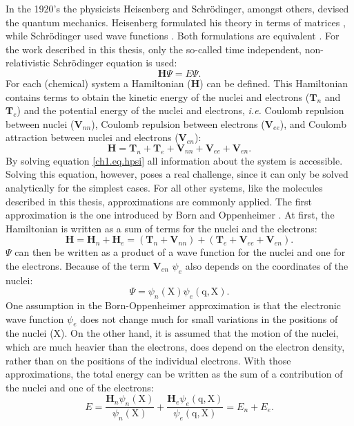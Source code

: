 In the 1920's the physicists Heisenberg and Schr\"{o}dinger, amongst others, devised the quantum mechanics. Heisenberg formulated his theory in terms of matrices \cite{heisenberg}, while Schr\"{o}dinger used wave functions \cite{schrodinger1,schrodinger2}. Both formulations are equivalent \cite{schrodinger3}. For the work described in this thesis, only the so-called time independent, non-relativistic Schr\"{o}dinger equation is used:
\begin{equation}
\mathbf{H} \Psi=E \Psi.
\label{ch1.eq.hpsi}
\end{equation}
For each (chemical) system a Hamiltonian ($\mathbf{H}$) can be defined. This Hamiltonian contains terms to obtain the kinetic energy of the nuclei and electrons ($\mathbf{T}_n$ and $\mathbf{T}_e$) and the potential energy of the nuclei and electrons, \textit{i.e.} Coulomb repulsion between nuclei ($\mathbf{V}_{nn}$), Coulomb repulsion between electrons ($\mathbf{V}_{ee}$), and Coulomb attraction between nuclei and electrons ($\mathbf{V}_{en}$):
\begin{equation}
\mathbf{H} = \mathbf{T}_n + \mathbf{T}_e + \mathbf{V}_{nn} + \mathbf{V}_{ee} + \mathbf{V}_{en}.
\label{ch1.eq.htotal}
\end{equation}
By solving equation \ref{ch1.eq.hpsi} all information about the system is accessible. Solving this equation, however, poses a real challenge, since it can only be solved analytically for the simplest cases. For all other systems, like the molecules described in this thesis, approximations are commonly applied. The first approximation is the one introduced by Born and Oppenheimer \cite{born}. At first, the Hamiltonian is written as a sum of terms for the nuclei and the electrons:
\begin{equation}
\mathbf{H} = \mathbf{H}_n + \mathbf{H}_e = (\mathbf{T}_n + \mathbf{V}_{nn}) + (\mathbf{T}_e + \mathbf{V}_{ee} + \mathbf{V}_{en}).
\label{ch1.eq.hsplit}
\end{equation}
$\Psi$ can then be written as a product of a wave function for the nuclei and one for the electrons. Because of the term $\mathbf{V}_{en}$ $\psi_{e}$ also depends on the coordinates of the nuclei:
\begin{equation}
\Psi = \psi_{n}(\mathrm{X}) \psi_{e}(\mathrm{q,X}).
\end{equation}
One assumption in the Born-Oppenheimer approximation is that the electronic wave function $\psi_{e}$ does not change much for small variations in the positions of the nuclei ($\mathrm{X}$). On the other hand, it is assumed that the motion of the nuclei, which are much heavier than the electrons, does depend on the electron density, rather than on the positions of the individual electrons. With those approximations, the total energy can be written as the sum of a contribution of the nuclei and one of the electrons:
\begin{equation}
E = \frac{\mathbf{H}_n \psi_n(\mathrm{X})}{\psi_n(\mathrm{X})} + \frac{\mathbf{H}_e \psi_e(\mathrm{q,X})}{\psi_e(\mathrm{q,X})} = E_{n} + E_{e}.
\end{equation}

